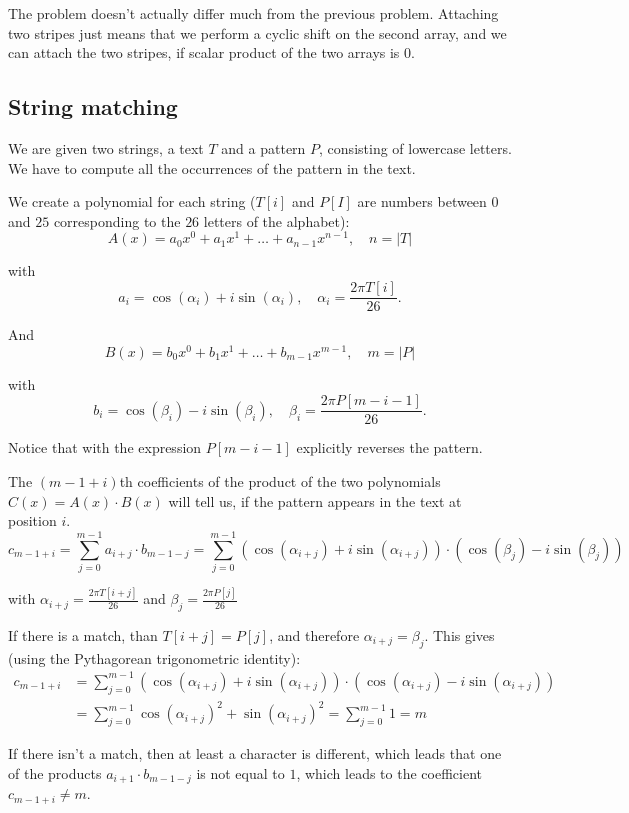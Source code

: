 \documentclass{article}
\begin{document}
The problem doesn't actually differ much from the previous problem. Attaching two stripes just means that we perform a cyclic shift on the second array, and we can attach the two stripes, if scalar product of the two arrays is $0$.

\subsection{String matching}

We are given two strings, a text $T$ and a pattern $P$, consisting of lowercase letters. We have to compute all the occurrences of the pattern in the text.

We create a polynomial for each string ($T[i]$ and $P[I]$ are numbers between $0$ and $25$ corresponding to the $26$ letters of the alphabet):
$$A(x) = a_0 x^0 + a_1 x^1 + \dots + a_{n-1} x^{n-1}, \quad n = |T|$$

with
$$a_i = \cos(\alpha_i) + i \sin(\alpha_i), \quad \alpha_i = \frac{2 \pi T[i]}{26}.$$

And
$$B(x) = b_0 x^0 + b_1 x^1 + \dots + b_{m-1} x^{m-1}, \quad m = |P|$$

with
$$b_i = \cos(\beta_i) - i \sin(\beta_i), \quad \beta_i = \frac{2 \pi P[m-i-1]}{26}.$$

Notice that with the expression $P[m-i-1]$ explicitly reverses the pattern.

The $(m-1+i)$th coefficients of the product of the two polynomials $C(x) = A(x) \cdot B(x)$ will tell us, if the pattern appears in the text at position $i$.
$$c_{m-1+i} = \sum_{j = 0}^{m-1} a_{i+j} \cdot b_{m-1-j} = \sum_{j=0}^{m-1} \left(\cos(\alpha_{i+j}) + i \sin(\alpha_{i+j})\right) \cdot \left(\cos(\beta_j) - i \sin(\beta_j)\right)$$

with $\alpha_{i+j} = \frac{2 \pi T[i+j]}{26}$ and $\beta_j = \frac{2 \pi P[j]}{26}$

If there is a match, than $T[i+j] = P[j]$, and therefore $\alpha_{i+j} = \beta_j$. This gives (using the Pythagorean trigonometric identity):
$$\begin{align} c_{m-1+i} &= \sum_{j = 0}^{m-1} \left(\cos(\alpha_{i+j}) + i \sin(\alpha_{i+j})\right) \cdot \left(\cos(\alpha_{i+j}) - i \sin(\alpha_{i+j})\right) \\ &= \sum_{j = 0}^{m-1} \cos(\alpha_{i+j})^2 + \sin(\alpha_{i+j})^2 = \sum_{j = 0}^{m-1} 1 = m \end{align}$$

If there isn't a match, then at least a character is different, which leads that one of the products $a_{i+1} \cdot b_{m-1-j}$ is not equal to $1$, which leads to the coefficient $c_{m-1+i} \ne m$.
\end{document}
